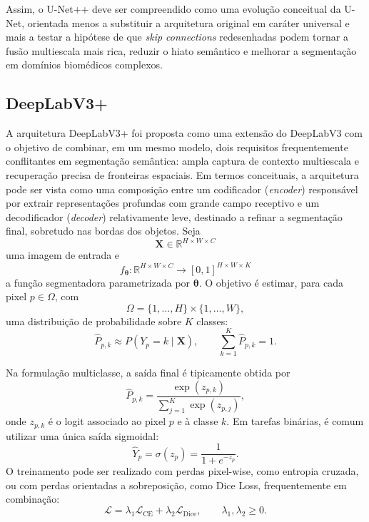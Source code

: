 \documentclass[tcc,capa]{texufpel}
\begin{document}
Assim, o U-Net++ deve ser compreendido como uma evolução conceitual da U-Net, orientada menos a substituir a arquitetura original em caráter universal e mais a testar a hipótese de que \textit{skip connections} redesenhadas podem tornar a fusão multiescala mais rica, reduzir o hiato semântico e melhorar a segmentação em domínios biomédicos complexos.

\subsection{DeepLabV3+}

A arquitetura DeepLabV3+ foi proposta como uma extensão do DeepLabV3 com o objetivo de combinar, em um mesmo modelo, dois requisitos frequentemente conflitantes em segmentação semântica: ampla captura de contexto multiescala e recuperação precisa de fronteiras espaciais. Em termos conceituais, a arquitetura pode ser vista como uma composição entre um codificador (\textit{encoder}) responsável por extrair representações profundas com grande campo receptivo e um decodificador (\textit{decoder}) relativamente leve, destinado a refinar a segmentação final, sobretudo nas bordas dos objetos. Seja
\begin{equation}
	\mathbf{X} \in \mathbb{R}^{H \times W \times C}
\end{equation}
uma imagem de entrada e
\begin{equation}
	f_{\boldsymbol{\theta}} : \mathbb{R}^{H \times W \times C} \rightarrow [0,1]^{H \times W \times K}
\end{equation}
a função segmentadora parametrizada por \(\boldsymbol{\theta}\). O objetivo é estimar, para cada pixel \(p \in \Omega\), com
\begin{equation}
	\Omega = \{1,\dots,H\}\times\{1,\dots,W\},
\end{equation}
uma distribuição de probabilidade sobre \(K\) classes:
\begin{equation}
	\hat{P}_{p,k} \approx P(Y_p = k \mid \mathbf{X}),
	\qquad
	\sum_{k=1}^{K}\hat{P}_{p,k}=1.
\end{equation}

Na formulação multiclasse, a saída final é tipicamente obtida por
\begin{equation}
	\hat{P}_{p,k}
	=
	\frac{\exp(z_{p,k})}{\sum_{j=1}^{K}\exp(z_{p,j})},
\end{equation}
onde \(z_{p,k}\) é o logit associado ao pixel \(p\) e à classe \(k\). Em tarefas binárias, é comum utilizar uma única saída sigmoidal:
\begin{equation}
	\hat{Y}_{p} = \sigma(z_p)=\frac{1}{1+e^{-z_p}}.
\end{equation}
O treinamento pode ser realizado com perdas pixel-wise, como entropia cruzada, ou com perdas orientadas a sobreposição, como Dice Loss, frequentemente em combinação:
\begin{equation}
	\mathcal{L}
	=
	\lambda_1 \mathcal{L}_{\text{CE}}
	+
	\lambda_2 \mathcal{L}_{\text{Dice}},
	\qquad
	\lambda_1,\lambda_2 \ge 0.
\end{equation}
\end{document}
